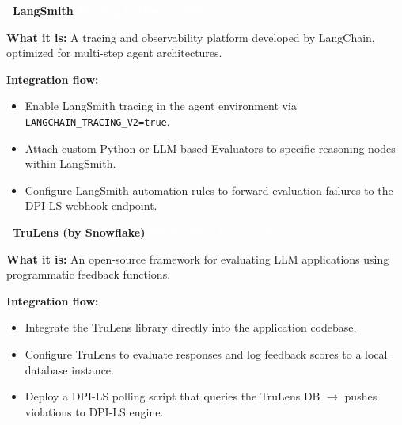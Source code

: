 \documentclass[11pt,a4paper]{article}
\begin{document}
\vspace{0.5cm}
\noindent\textbf{\large \faProjectDiagram\ LangSmith} \quad \colorbox{dpiblue}{\textcolor{white}{\small \textbf{Tracing \& Observability}}}\\[0.2cm]
\begin{tcolorbox}[enhanced, colback=white, colframe=dpiblue, boxrule=0pt, leftrule=3pt, sharp corners, top=2mm, bottom=2mm]
\textbf{What it is:} A tracing and observability platform developed by LangChain, optimized for multi-step agent architectures.

\textbf{Integration flow:}
\begin{itemize}
    \item[\textcolor{dpiblue}{\textbf{1.}}] Enable LangSmith tracing in the agent environment via \texttt{LANGCHAIN\_TRACING\_V2=true}.
    \item[\textcolor{dpiblue}{\textbf{2.}}] Attach custom Python or LLM-based Evaluators to specific reasoning nodes within LangSmith.
    \item[\textcolor{dpiblue}{\textbf{3.}}] Configure LangSmith automation rules to forward evaluation failures to the DPI-LS webhook endpoint.
\end{itemize}
\end{tcolorbox}

\vspace{0.5cm}
\noindent\textbf{\large \faDatabase\ TruLens (by Snowflake)} \quad \colorbox{dpigreen}{\textcolor{white}{\small \textbf{On-Premise Governance}}}\\[0.2cm]
\begin{tcolorbox}[enhanced, colback=white, colframe=dpigreen, boxrule=0pt, leftrule=3pt, sharp corners, top=2mm, bottom=2mm]
\textbf{What it is:} An open-source framework for evaluating LLM applications using programmatic feedback functions.

\textbf{Integration flow:}
\begin{itemize}
    \item[\textcolor{dpigreen}{\textbf{1.}}] Integrate the TruLens library directly into the application codebase.
    \item[\textcolor{dpigreen}{\textbf{2.}}] Configure TruLens to evaluate responses and log feedback scores to a local database instance.
    \item[\textcolor{dpigreen}{\textbf{3.}}] Deploy a DPI-LS polling script that queries the TruLens DB $\rightarrow$ pushes violations to DPI-LS engine.
\end{itemize}
\end{tcolorbox}
\end{document}
